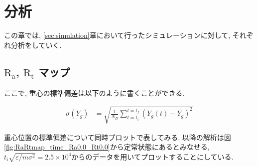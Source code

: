 \section{分析}

この章では, \ref{sec:simulation}章において行ったシミュレーションに対して, それぞれ分析をしていく.

\subsection{$\text{R}_\text{a}$, $\text{R}_\text{t}$ マップ}


ここで, 重心の標準偏差は以下のように書くことができる.

\begin{align}
  \sigma (Y_g) &= \sqrt{\frac{1}{N_{D}}\sum_{t=t_i}^{t=t_f} (Y_{g}(t) - \bar{Y_g})^2}
\end{align}

重心位置の標準偏差について同時プロットで表してみる. 以降の解析は図\ref{fig:RaRtmap_time_Ra0.0_Rt0.0}から定常状態にあるとみなせる, $t_i \sqrt{\varepsilon / m \sigma^2} = 2.5 \times 10^{4}$からのデータを用いてプロットすることにしている.

